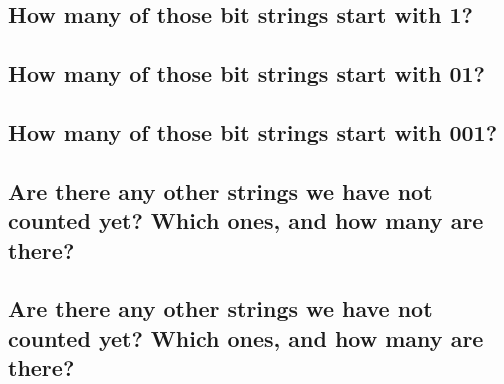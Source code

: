 \documentclass{article}
\begin{document}
\subsection{How many of those bit strings start with 1?}
\subsection{How many of those bit strings start with 01?}
\subsection{How many of those bit strings start with 001?}
\subsection{Are there any other strings we have not counted yet? Which ones, and how many are there?}
\subsection{Are there any other strings we have not counted yet? Which ones, and how many are there?}
\end{document}
